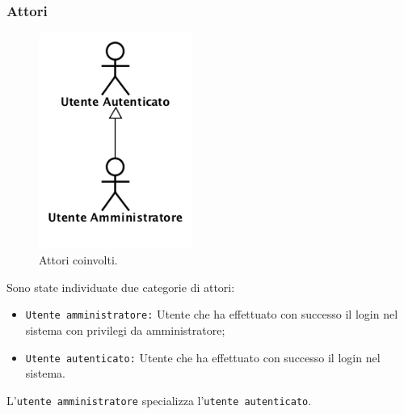 	\subsubsection{Attori}
	\begin{figure}[H]
		\begin{center}
			\includegraphics[width=5cm]{Pics/Attori.png}
			\caption{Attori coinvolti.}
			\label{fig:DiagrammaAttori}
		\end{center}
	\end{figure}	
	Sono state individuate due categorie di attori: 
	\begin{itemize}
		\item \texttt{Utente amministratore:} Utente che ha effettuato con successo il login nel sistema con privilegi da amministratore;
		\item \texttt{Utente autenticato:} Utente che ha effettuato con successo il login nel sistema.
	\end{itemize}
	
	L'\texttt{utente amministratore} specializza l'\texttt{utente autenticato}.
	
	\newpage
